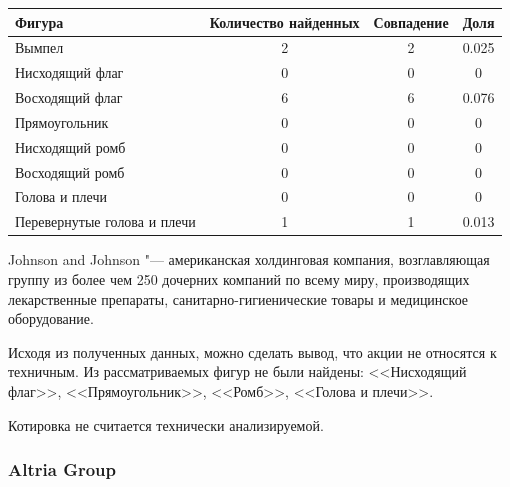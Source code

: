 \documentclass[bachelor, och, coursework]{SCWorks}
\begin{document}
    \begin{table}[!hbt]
        \centering
        \begin{tabular}{|l|c|c|c|}
        \hline
        Фигура                      & \multicolumn{1}{l|}{Количество найденных} & Совпадение & Доля  \\ \hline
        Вымпел                      & 2                                         & 2          & 0.025 \\ \hline
        Нисходящий флаг             & 0                                         & 0          & 0     \\ \hline
        Восходящий флаг             & 6                                         & 6          & 0.076 \\ \hline
        Прямоугольник               & 0                                         & 0          & 0     \\ \hline
        Нисходящий ромб             & 0                                         & 0          & 0     \\ \hline
        Восходящий ромб             & 0                                         & 0          & 0     \\ \hline
        Голова и плечи              & 0                                         & 0          & 0     \\ \hline
        Перевернутые голова и плечи & 1                                         & 1          & 0.013 \\ \hline
        \end{tabular}
        \end{table}

    
        Johnson and Johnson "--- американская холдинговая компания, возглавляющая
        группу из более чем 250 дочерних компаний по всему миру, производящих
        лекарственные препараты, санитарно-гигиенические товары и медицинское
        оборудование.
    
        Исходя из полученных данных, можно сделать вывод, что акции не относятся
        к техничным. Из рассматриваемых фигур не были найдены: <<Нисходящий 
        флаг>>, <<Прямоугольник>>, <<Ромб>>, <<Голова и плечи>>.

        Котировка не считается технически анализируемой.

        \subsubsection{Altria Group}
    
\end{document}
